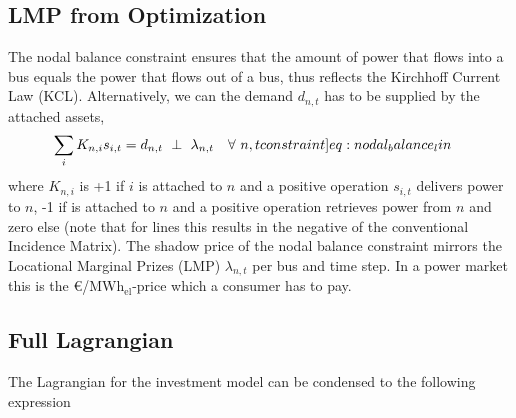 \documentclass[11pt,twocolumn]{article}
\newcommand{\resultsin}[1]{\hspace{6pt} \bot  \hspace{6pt} #1}
\newcommand{\Forall}[1]{\hspace{10pt} \forall \,\, #1 }
\newcommand{\state}{s_{i,t}}
\newcommand{\nodalgeneration}[1][n]{g_{#1,t}}
\newcommand{\flow}{f_{\ell,t}}
\newcommand{\lmp}[1][n]{\lambda_{#1,t}}
\newcommand{\demand}[1][n]{d_{#1,t}}
\newcommand{\nodaldemand}[1][n]{d_{#1,t}}
\newcommand{\incidence}[1][n]{K_{#1,\ell}}
\newcommand{\incidenceasset}[1][n]{K_{#1,i}}
\newcommand{\megawatthour}{MWh$_\text{el}$}
\begin{document}
\subsection{LMP from Optimization}
The nodal balance constraint ensures that the amount of power that flows into a bus equals the power that flows out of a bus, thus reflects the Kirchhoff Current Law (KCL). Alternatively, we can the demand $\demand$ has to be supplied by the attached assets,  
\begin{align}
    \sum_i \incidenceasset \state  &=  \demand 
     \resultsin{\lmp} \Forall{n,t}
    \label[constraint]{eq:nodal_balance_lin}
\end{align}
where $\incidenceasset$ is +1 if $i$ is attached to $n$ and a positive operation $\state$ delivers power to $n$, -1 if is attached to $n$ and a positive operation retrieves power from $n$ and zero else (note that for lines this results in the negative of the conventional Incidence Matrix).  
The shadow price of the nodal balance constraint mirrors the Locational Marginal Prizes (LMP) $\lmp$ per bus and time step. In a power market this is the \euro/\megawatthour-price which a consumer has to pay.\\

\subsection{Full Lagrangian}
\label{sec:full_lagrangian}
The Lagrangian for the investment model can be condensed to the following expression
\end{document}
